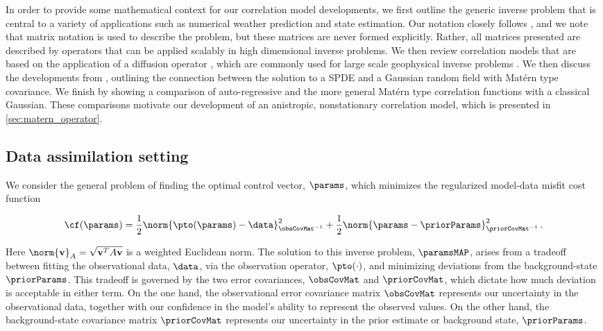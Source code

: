 \documentclass[alpha-refs]{wiley-article}
\begin{document}
In order to provide some mathematical context for our correlation model
developments, we first outline the generic inverse problem that is central to
a variety of applications such as numerical weather prediction and state
estimation.
Our notation closely follows \citet{ide_unified_1997}, and we note that matrix
notation is used to describe the problem, but these matrices are never formed
explicitly.
Rather, all matrices presented are described by operators that can be applied
scalably in high dimensional inverse problems.
We then review correlation models that are based on the application of a
diffusion operator \citep{weaver_correlation_2001,mirouze_representation_2010},
which are commonly used for large scale geophysical inverse problems
\citep[e.g.,][]{forgetECCOv4,moore_regional_2011-1}.
We then discuss the developments from , outlining the
connection between the solution to a SPDE and a Gaussian random
field with Mat\'ern type covariance.
We finish by showing a comparison of auto-regressive and the more general
Mat\'ern type correlation functions with a classical Gaussian.
These comparisons motivate our development of an anistropic, nonstationary correlation
model, which is presented in \cref{sec:matern_operator}.


\subsection{Data assimilation setting}
\label{ssec:da_formulation}

We consider the general problem of finding the optimal control vector,
$\params$, which minimizes the regularized model-data misfit cost function
\begin{linenomath*}\begin{equation*}
    \cf(\params) =
        \dfrac{1}{2}\norm{\pto(\params) - \data}_{\obsCovMat^{-1}}^2
        +
        \dfrac{1}{2}\norm{\params - \priorParams}_{\priorCovMat^{-1}}^2 \, .
\end{equation*}\end{linenomath*}
Here $\norm{\mathbf{v}}_A = \sqrt{\mathbf{v}^T A \mathbf{v}}$ is a weighted
Euclidean norm.
The solution to this inverse problem, $\paramsMAP$, arises from a tradeoff between fitting the
observational data, $\data$, via the observation operator, $\pto(\cdot)$,
and minimizing deviations from the background-state $\priorParams$.
This tradeoff is governed by the two error covariances, $\obsCovMat$ and
$\priorCovMat$, which dictate how much deviation is acceptable in either term.
On the one hand, the observational error covariance matrix
$\obsCovMat$ represents our uncertainty
in the observational data, together with our confidence in the model's ability
to represent the observed values.
On the other hand, the background-state covariance matrix $\priorCovMat$
represents our uncertainty in the prior estimate or background state,
$\priorParams$.
\end{document}
